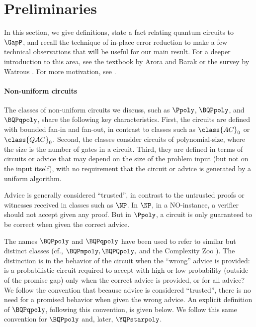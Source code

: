 \documentclass{toc}
\begin{document}
%
\section{Preliminaries}

In this section, we give definitions, state a fact relating quantum circuits to $\GapP$,
and recall the technique of in-place error reduction
to make a few technical observations that will be useful for our main result.
For a deeper introduction to this area,
see the textbook by Arora and Barak \cite{arora2009computational} or the survey by Watrous \cite{watrous2008quantum}.
For more motivation, see
\cite{aaronson_subtle,aaronson2014full}.


\paragraph{Non-uniform circuits}
The classes of non-uniform circuits we discuss, such as $\Ppoly$, $\BQPpoly$, and $\BQPqpoly$,
share the following key characteristics.
First, the circuits are defined with bounded fan-in and fan-out, in contrast to
classes such as $\class{AC}_0$ or $\class{QAC}_0$.
Second, the classes consider circuits of polynomial-size,
where the size is the number of gates in a circuit.
Third, they are defined in terms of circuits or advice that may depend
on the size of the problem input (but not on the input itself),
with no requirement that the circuit or advice is generated by a uniform algorithm.

Advice is generally considered ``trusted'', in contrast to the
untrusted proofs or witnesses received in classes such as $\NP$.
In $\NP$, in a NO-instance, a verifier should not accept given any proof.
But in $\Ppoly$, a circuit is only guaranteed to be correct when given the correct advice.

The names $\BQPpoly$ and $\BQPqpoly$ have been used to refer to similar but distinct classes
(cf., $\BQPmpoly, \BQPQpoly,$ and the Complexity Zoo \cite{ZooBQPmpoly}).
The distinction is in the behavior of the circuit when the ``wrong'' advice is provided:
is a probabilistic circuit required to accept with high or low probability
(outside of the promise gap) only when the correct advice is provided, or for all advice? 
We follow the convention that because
advice is considered ``trusted'', there is no need for a promised behavior
when given the wrong advice.
An explicit definition of $\BQPqpoly$, following this convention, is given below.
We follow this same convention for $\BQPpoly$ and, later, $\YQPstarpoly$.
\end{document}
